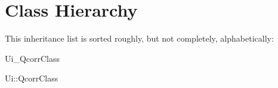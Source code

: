 \section{Class Hierarchy}
This inheritance list is sorted roughly, but not completely, alphabetically:\begin{CompactList}
\item {}
\item {}
\item {}
\item {}
\item Ui\_\-QcorrClass\begin{CompactList}
\item Ui::QcorrClass\begin{CompactList}
\item {}
\end{CompactList}
\end{CompactList}
\end{CompactList}
